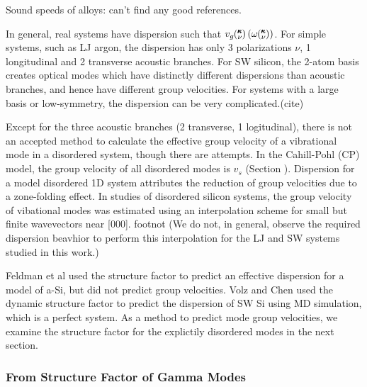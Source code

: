 \documentclass[aps,prb,twocolumn,superscriptaddress,amsmath,amssymb,floatfix]{revtex4}
\newcommand{\kv}{\mspace{-4.0mu}\left(\mspace{-8.0mu}
\begin{smallmatrix}&\pmb{\kappa} \\&\nu\end{smallmatrix}
\mspace{-3.0mu}\right)}
\begin{document}
Sound speeds of alloys: can't find any good references.

In general, real systems have dispersion such that 
$v_g\kv(\omega\kv)$.  For simple systems, such as LJ argon, the 
dispersion has only 3 polarizations $\nu$, 
1 longitudinal and 2 transverse acoustic branches.
\cite{dove_introduction_1993} For SW silicon, the 2-atom basis creates 
optical modes which have distinctly different dispersions than 
acoustic branches, and hence have different group velocities.  For 
systems with a large basis or low-symmetry, 
the dispersion can be very complicated.(cite)

Except for the three 
acoustic branches (2 transverse, 1 logitudinal), there is not an 
accepted method to calculate the effective group velocity of a 
vibrational mode in a disordered system, though there are attempts.
\cite{cahill_lattice_1988,duda_reducing_2011,donadio_atomistic_2009,
he_heat_2011,he_thermal_2011} 
In the Cahill-Pohl (CP) model, the group velocity of all disordered 
modes is $v_s$ (Section ).\cite{cahill_lattice_1988} 
Dispersion for a model disordered 1D system attributes  
the reduction of group 
velocities due to a 
zone-folding effect.\cite{duda_reducing_2011} 
In studies of disordered silicon systems, the group velocity of 
vibational modes was estimated using an interpolation scheme for 
small but finite wavevectors 
near [000]. 
\cite{donadio_atomistic_2009,he_heat_2011,he_thermal_2011} 
footnot
(We do not, in general, observe the required dispersion 
beavhior to perform this interpolation for the LJ and SW systems 
studied in this work.)

Feldman et al used the structure factor to predict an effective dispersion 
for a model of a-Si, but did not predict group velocities.
\cite{feldman_numerical_1999} 
Volz and Chen used the dynamic structure factor to predict the
dispersion of SW Si using MD simulation, which is a perfect system.
\cite{volz_molecular-dynamics_2000} As a method to predict mode group 
velocities, we examine the structure factor 
for the explictily disordered modes in the next section.

\subsubsection{\label{S:From Structure Factor}
From Structure Factor of Gamma Modes}
\end{document}
